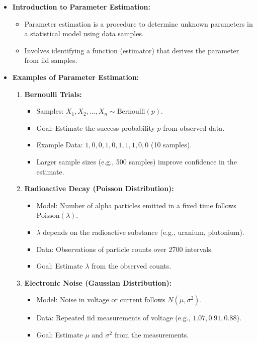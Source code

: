 \documentclass{article}
\begin{document}
\begin{itemize}
  \item \textbf{Introduction to Parameter Estimation:}
    \begin{itemize}
      \item Parameter estimation is a procedure to determine unknown parameters in a statistical model using data samples.
      \item Involves identifying a function (estimator) that derives the parameter from iid samples.
    \end{itemize}

  \item \textbf{Examples of Parameter Estimation:}
    \begin{enumerate}
      \item \textbf{Bernoulli Trials:}
        \begin{itemize}
          \item Samples: $X_1, X_2, \dots, X_n \sim \text{Bernoulli}(p)$.
          \item Goal: Estimate the success probability $p$ from observed data.
          \item Example Data: $1, 0, 0, 1, 0, 1, 1, 1, 0, 0$ (10 samples).
          \item Larger sample sizes (e.g., 500 samples) improve confidence in the estimate.
        \end{itemize}

      \item \textbf{Radioactive Decay (Poisson Distribution):}
        \begin{itemize}
          \item Model: Number of alpha particles emitted in a fixed time follows $\text{Poisson}(\lambda)$.
          \item $\lambda$ depends on the radioactive substance (e.g., uranium, plutonium).
          \item Data: Observations of particle counts over 2700 intervals.
          \item Goal: Estimate $\lambda$ from the observed counts.
        \end{itemize}

      \item \textbf{Electronic Noise (Gaussian Distribution):}
        \begin{itemize}
          \item Model: Noise in voltage or current follows $N(\mu, \sigma^2)$.
          \item Data: Repeated iid measurements of voltage (e.g., $1.07, 0.91, 0.88$).
          \item Goal: Estimate $\mu$ and $\sigma^2$ from the measurements.
        \end{itemize}
    \end{enumerate}


\end{itemize}
\end{document}

